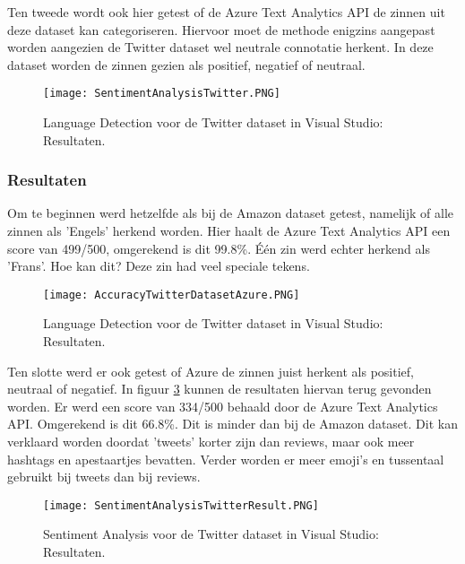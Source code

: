 Ten tweede wordt ook hier getest of de Azure Text Analytics API de zinnen uit deze dataset kan categoriseren. Hiervoor moet de methode enigzins aangepast worden aangezien de Twitter dataset wel neutrale connotatie herkent. In deze dataset worden de zinnen gezien als positief, negatief of neutraal. 

\begin{figure}[!htbp]
    \texttt{[image: SentimentAnalysisTwitter.PNG]}
    \caption{\label{azuresentimentanalysistwitter}Language Detection voor de Twitter dataset in Visual Studio: Resultaten.}
\end{figure}
\FloatBarrier 


\subsubsection{Resultaten}
\label{twitterdatasetresultatenazure}
Om te beginnen werd hetzelfde als bij de Amazon dataset getest, namelijk of alle zinnen als 'Engels' herkend worden. 
Hier haalt de Azure Text Analytics API een score van 499/500, omgerekend is dit 99.8\%. Één zin werd echter herkend als 'Frans'. Hoe kan dit? Deze zin had veel speciale tekens. 

\begin{figure}[!htbp]
    \texttt{[image: AccuracyTwitterDatasetAzure.PNG]}
    \caption{\label{azurelanguagedetectiontwitterresults}Language Detection voor de Twitter dataset in Visual Studio: Resultaten.}
\end{figure}
\FloatBarrier 

Ten slotte werd er ook getest of Azure de zinnen juist herkent als positief, neutraal of negatief. In figuur \ref{azuresentimentanalysistwitterresults} kunnen de resultaten hiervan terug gevonden worden. Er werd een score van 334/500 behaald door de Azure Text Analytics API. Omgerekend is dit 66.8\%. Dit is minder dan bij de Amazon dataset. Dit kan verklaard worden doordat 'tweets' korter zijn dan reviews, maar ook meer hashtags en apestaartjes bevatten. Verder worden er meer emoji's en tussentaal gebruikt bij tweets dan bij reviews.

\begin{figure}[!htbp]
    \texttt{[image: SentimentAnalysisTwitterResult.PNG]}
    \caption{\label{azuresentimentanalysistwitterresults}Sentiment Analysis voor de Twitter dataset in Visual Studio: Resultaten.}
\end{figure}
\FloatBarrier 

